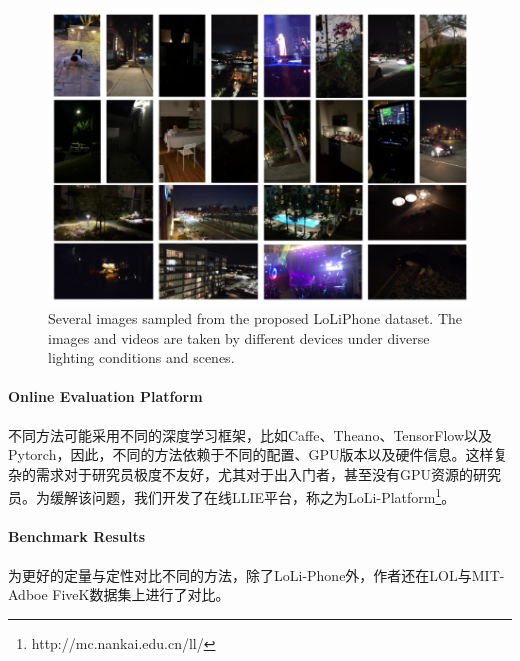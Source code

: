 \documentclass[letterpaper,12pt]{article}
\begin{document}
	\begin{figure}[ht] 
		\centering \includegraphics[width=0.8\columnwidth]{Sample_Loli}
		\caption{
			\label{fig:Sample_Loli} %
			Several images sampled from the proposed LoLiPhone dataset. The images and videos are taken by different devices under diverse lighting conditions and scenes.
		}
	\end{figure}
	
	\paragraph{Online Evaluation Platform} \qquad
	
	不同方法可能采用不同的深度学习框架，比如Caffe、Theano、TensorFlow以及Pytorch，因此，不同的方法依赖于不同的配置、GPU版本以及硬件信息。这样复杂的需求对于研究员极度不友好，尤其对于出入门者，甚至没有GPU资源的研究员。为缓解该问题，我们开发了在线LLIE平台，称之为LoLi-Platform\footnote{http://mc.nankai.edu.cn/ll/}。
	
	\paragraph{Benchmark Results} \qquad
	
	为更好的定量与定性对比不同的方法，除了LoLi-Phone外，作者还在LOL与MIT-Adboe FiveK数据集上进行了对比。
	
\end{document}
